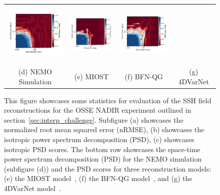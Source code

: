 \begin{figure}[t!]
\begin{center}
\begin{tabular}{cccc}
\includegraphics[trim={20mm 0 34mm 0},clip, width=2.9cm,height=3cm]{content/figures/psd_spacetime/dc20a/nadir4/dc20a_psd_spacetime_score_miost_nadir4_ssh.png} &
\includegraphics[trim={20mm 0 34mm 0},clip, width=2.9cm,height=3cm]{content/figures/psd_spacetime/dc20a/nadir4/dc20a_psd_spacetime_score_bfnqg_nadir4_ssh.png} &
\includegraphics[trim={20mm 0 0 0},clip, width=3.5cm,height=3cm]{content/figures/psd_spacetime/dc20a/nadir4/dc20a_psd_spacetime_score_4dvarnet_nadir4_ssh.png} \\
(d) NEMO Simulation &
(e) MIOST &
(f) BFN-QG &
(g) 4DVarNet
\end{tabular}
\caption{This figure showcases some statistics for evaluation of the SSH field reconstructions for the OSSE NADIR experiment outlined in section~\ref{sec:interp_challenge}. Subfigure (a) showcases the normalized root mean squared error (nRMSE), (b) showcases the isotropic power spectrum decomposition (PSD), (c) showcases isotropic PSD scores.
The bottom row showcases the space-time power spectrum decomposition (PSD) for the NEMO simulation (subfigure (d)) and the PSD scores for three reconstruction models: (e) the MIOST model~\cite{MIOST}, (f) the BFN-QG model~\cite{BFNQG}, and (g) the 4DVarNet model~\cite{4DVARNETSWOT}.
}
\label{fig:oceanbench_psd}
\end{center}
\end{figure}


